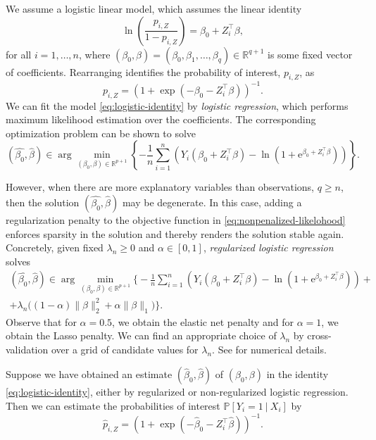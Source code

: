\documentclass[11pt]{article}
\renewcommand{\P}{\mathbb{P}}
\newcommand{\R}{\mathbb{R}}
\newcommand{\e}{\text{e}}
\begin{document}
We assume a logistic linear model, which assumes the linear identity
\begin{equation}\label{eq:logistic-identity}
    \ln \left( \frac{p_{i,Z}}{1 - p_{i,Z}} \right)
    =
    \beta_0 + Z_i^\top \beta, 
\end{equation}
for all $i=1,\dots,n$, where $(\beta_0, \beta) = (\beta_0,\beta_1,\dots,\beta_q)\in\R^{q+1}$ is some fixed vector of coefficients. Rearranging identifies the probability of interest, $p_{i,Z}$, as
\begin{equation*}
    p_{i,Z} = \left( 1 + \exp\left( -\beta_0 - Z_i^\top \beta\right) \right)^{-1}.
\end{equation*}
We can fit the model \eqref{eq:logistic-identity} by \textit{logistic regression}, which performs maximum likelihood estimation over the coefficients. The corresponding optimization problem can be shown to solve
\begin{equation}\label{eq:nonpenalized-likelohood}
    (\widehat{\beta_0}, \widehat{\beta})
    \in 
    \arg \min_{(\beta_0, \beta) \in \R^{p+1}}
    \left\{
    -
    \frac{1}{n} \sum_{i=1}^n \left(
    Y_i (\beta_0 + Z_i^\top \beta)
    -
    \ln 
    \left(
    1 + \e^{\beta_0 + Z_i^\top \beta}
    \right)
    \right)\right\}.
\end{equation}

However, when there are more explanatory variables than observations, $q \geq n$, then the solution $(\widehat{\beta_0}, \widehat{\beta})$ may be degenerate. In this case, adding a regularization penalty to the objective function in  \eqref{eq:nonpenalized-likelohood} enforces sparsity in the solution and thereby renders the solution stable again. Concretely, given fixed $\lambda_n \geq 0$ and $\alpha \in [0,1]$, \textit{regularized logistic regression} solves
\begin{equation}\label{eq:penalized-likelohood}
\begin{split}
    (\widehat{\beta_0}, \widehat{\beta})
    \in 
    \arg \min_{(\beta_0, \beta) \in \R^{p+1}}
    \Bigg\{
    -
    \frac{1}{n} \sum_{i=1}^n \left(
    Y_i (\beta_0 + Z_i^\top \beta)
    -
    \ln 
    \left(
    1 + \e^{\beta_0 + Z_i^\top \beta}
    \right)
    \right) 
    +
    \\
    +
    \lambda_n \Big( 
    (1-\alpha) \| \beta \|_2^2 + \alpha \|\beta \|_1
    \Big)
    \Bigg\}.
\end{split}
\end{equation}
Observe that for $\alpha=0.5$, we obtain the elastic net penalty and for $\alpha=1$, we obtain the Lasso penalty. We can find an appropriate choice of $\lambda_n$ by cross-validation over a grid of candidate values for $\lambda_n$. See \cite{friedman2010} for numerical details. 

Suppose we have obtained an estimate $(\widehat{\beta}_0, \widehat{\beta})$ of $(\beta_0, \beta)$ in the identity \eqref{eq:logistic-identity}, either by regularized or non-regularized logistic regression. Then we can estimate the probabilities of interest $\P[Y_i =1\ |\ X_i]$ by
\[
    \widehat{p}_{i,Z} = \left( 1 + \exp\left( -\widehat{\beta}_0 - Z_i^\top \widehat{\beta}\right) \right)^{-1}.
\]



\end{document}
